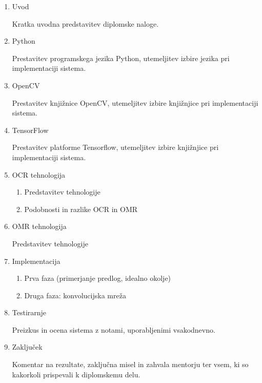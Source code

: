 \documentclass[11pt,a4paper]{article}
\begin{document}
\begin{enumerate}
\item Uvod

Kratka uvodna predstavitev diplomske naloge.
\item Python

Prestavitev programskega jezika Python, utemeljitev izbire jezika pri implementaciji sistema.

\item OpenCV

Prestavitev knjižnice OpenCV, utemeljitev izbire knjižnjice pri implementaciji sistema.

\item TensorFlow

Prestavitev platforme Tensorflow, utemeljitev izbire knjižnjice pri implementaciji sistema.


\item OCR tehnologija
\begin{enumerate}
\item Predstavitev tehnologije

\item Podobnosti in razlike OCR in OMR
\end{enumerate}

\item OMR tehnologija

Predstavitev tehnologije

\item Implementacija
\begin{enumerate}
\item Prva faza (primerjanje predlog, idealno okolje)

\item Druga faza: konvolucijska mreža
\end{enumerate}

\item Testirarnje

Preizkus in ocena sistema z notami, uporabljenimi vsakodnevno.

\item Zaključek

Komentar na rezultate, zaključna misel in zahvala mentorju ter vsem, ki so kakorkoli prispevali k diplomskemu delu.
\end{enumerate}




\end{document}
